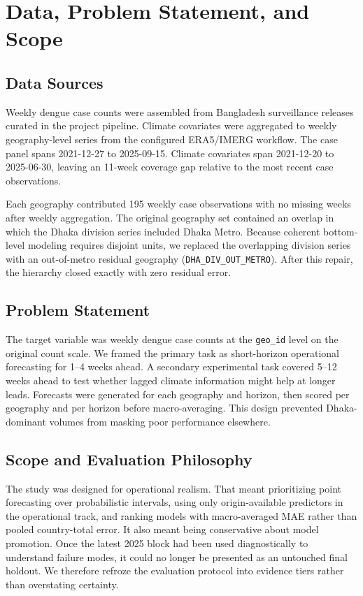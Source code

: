 \documentclass[11pt]{article}
\begin{document}
\section{Data, Problem Statement, and Scope}
\subsection{Data Sources}
Weekly dengue case counts were assembled from Bangladesh surveillance releases curated in the project pipeline. Climate covariates were aggregated to weekly geography-level series from the configured ERA5/IMERG workflow. The case panel spans 2021-12-27 to 2025-09-15. Climate covariates span 2021-12-20 to 2025-06-30, leaving an 11-week coverage gap relative to the most recent case observations.

Each geography contributed 195 weekly case observations with no missing weeks after weekly aggregation. The original geography set contained an overlap in which the Dhaka division series included Dhaka Metro. Because coherent bottom-level modeling requires disjoint units, we replaced the overlapping division series with an out-of-metro residual geography (\texttt{DHA\_DIV\_OUT\_METRO}). After this repair, the hierarchy closed exactly with zero residual error.

\subsection{Problem Statement}
The target variable was weekly dengue case counts at the \texttt{geo\_id} level on the original count scale. We framed the primary task as short-horizon operational forecasting for 1--4 weeks ahead. A secondary experimental task covered 5--12 weeks ahead to test whether lagged climate information might help at longer leads. Forecasts were generated for each geography and horizon, then scored per geography and per horizon before macro-averaging. This design prevented Dhaka-dominant volumes from masking poor performance elsewhere.

\subsection{Scope and Evaluation Philosophy}
The study was designed for operational realism. That meant prioritizing point forecasting over probabilistic intervals, using only origin-available predictors in the operational track, and ranking models with macro-averaged MAE rather than pooled country-total error. It also meant being conservative about model promotion. Once the latest 2025 block had been used diagnostically to understand failure modes, it could no longer be presented as an untouched final holdout. We therefore refroze the evaluation protocol into evidence tiers rather than overstating certainty.
\end{document}
